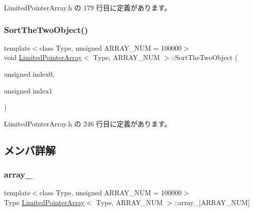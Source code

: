  Limited\+Pointer\+Array.\+h の 179 行目に定義があります。

\mbox{\label{class_limited_pointer_array_a0d33dc5dd8ed01bb00accd6378aa1b47}} 
\subsubsection{\texorpdfstring{Sort\+The\+Two\+Object()}{SortTheTwoObject()}}
{\footnotesize\ttfamily template$<$class Type, unsigned A\+R\+R\+A\+Y\+\_\+\+N\+UM = 100000$>$ \\
void \mbox{\hyperlink{class_limited_pointer_array}{Limited\+Pointer\+Array}}$<$ Type, A\+R\+R\+A\+Y\+\_\+\+N\+UM $>$\+::Sort\+The\+Two\+Object (\begin{DoxyParamCaption}\item[{unsigned}]{index0,  }\item[{unsigned}]{index1 }\end{DoxyParamCaption})\hspace{0.3cm}{\ttfamily [inline]}}



 Limited\+Pointer\+Array.\+h の 246 行目に定義があります。



\subsection{メンバ詳解}
\mbox{\label{class_limited_pointer_array_a80e958d7818fc6ee0e757b56abc937a4}} 
\subsubsection{\texorpdfstring{array\+\_\+}{array\_}}
{\footnotesize\ttfamily template$<$class Type, unsigned A\+R\+R\+A\+Y\+\_\+\+N\+UM = 100000$>$ \\
Type \mbox{\hyperlink{class_limited_pointer_array}{Limited\+Pointer\+Array}}$<$ Type, A\+R\+R\+A\+Y\+\_\+\+N\+UM $>$\+::array\+\_\+\mbox{[}A\+R\+R\+A\+Y\+\_\+\+N\+UM\mbox{]}\hspace{0.3cm}{\ttfamily [private]}}



